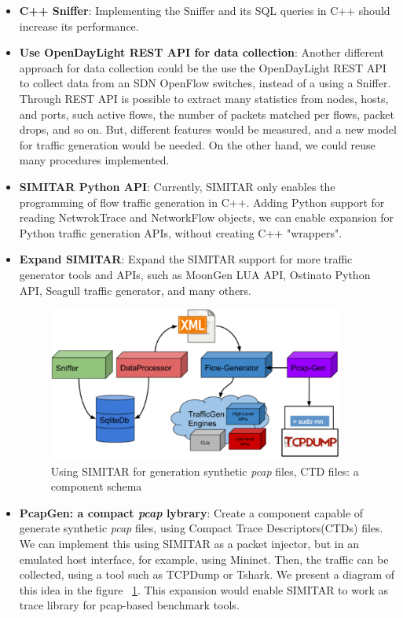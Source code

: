 \begin{itemize}
	
	\item \textbf{C++ Sniffer}: Implementing the Sniffer and its SQL queries in C++ should increase its performance.
	
	\item \textbf{Use OpenDayLight REST API for data collection}: Another different approach for data collection could be the use the OpenDayLight REST API to collect data from an SDN OpenFlow switches, instead of a using a Sniffer. Through REST API is possible to extract many statistics from nodes, hosts, and ports, such active flows, the number of packets matched per flows, packet drops, and so on. But, different features would be measured,  and a new model for traffic generation would be needed. On the other hand, we could reuse many procedures implemented.  
	
	\item \textbf{SIMITAR Python API}: Currently, SIMITAR only enables the programming of flow traffic generation in C++. Adding Python support for reading NetwrokTrace and NetworkFlow objects, we can enable expansion for Python traffic generation APIs, without creating C++ "wrappers".
	
	\item \textbf{Expand SIMITAR}: Expand the SIMITAR support for more traffic generator tools and APIs, such as MoonGen LUA API, Ostinato Python API, Seagull traffic generator, and many others.
	
	\begin{figure}[!ht]
		\centering
		\includegraphics[height=2.0in]{figures/ch6/pcap-gen}
		\caption{Using SIMITAR for generation synthetic \textit{pcap} files, CTD files: a component schema}
		\label{fig:pcap-gen}
	\end{figure}
	
	\item \textbf{PcapGen: a compact \textit{pcap} lybrary}: Create a component capable of generate synthetic \textit{pcap} files, using Compact Trace Descriptors(CTDs) files. We can implement this using SIMITAR as a packet injector, but in an emulated host interface, for example, using Mininet. Then, the traffic can be collected, using a tool such as TCPDump or Tshark. We present a diagram of this idea in the figure ~\ref{fig:pcap-gen}. This expansion would enable SIMITAR  to work as trace library for pcap-based benchmark tools.
	
	
	
\end{itemize}


